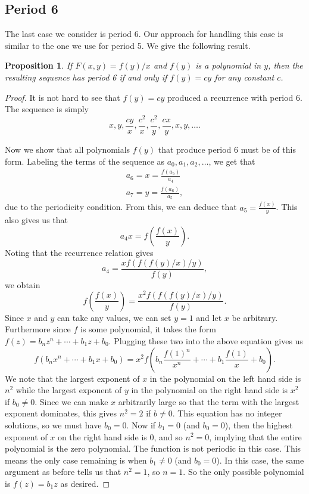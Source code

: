 \documentclass[12pt]{article}
\newtheorem{proposition}{Proposition}
\begin{document}
\subsection{Period 6}

The last case we consider is period 6. Our approach for handling this case is similar to the one we use for period 5. We give the following result.

\begin{proposition}
If $F(x,y) = f(y)/x$ and $f(y)$ is a polynomial in $y$, then the resulting sequence has period 6 if and only if $f(y) = cy$ for any constant $c$.
\end{proposition}

\begin{proof}
It is not hard to see that $f(y) = cy$ produced a recurrence with period 6. The sequence is simply
\[ x, y, \frac{cy}{x}, \frac{c^2}{x}, \frac{c^2}{y}, \frac{cx}{y}, x,y,\dots .\]

Now we show that all polynomials $f(y)$ that produce period 6 must be of this form. Labeling the terms of the sequence as $a_0, a_1, a_2, \dots$, we get that 
\begin{align*}
a_6 =x = \frac{f(a_5)}{a_4} \\ 
a_7 = y = \frac{f(a_6)}{a_5},
\end{align*}
due to the periodicity condition. From this, we can deduce that $a_5 = \frac{f(x)}{y}$. This also gives us that 
\begin{equation*}
a_4 x = f\left( \frac{f(x)}{y} \right).
\end{equation*}
Noting that the recurrence relation gives
\begin{equation*}
a_4 = \frac{ x f(f(f(y)/x)/y)}{f(y)}, 
\end{equation*}
we obtain 
\begin{equation*}
 f\left( \frac{f(x)}{y} \right) = \frac{ x^2 f(f(f(y)/x)/y)}{f(y)}.
\end{equation*}
Since $x$ and $y$ can take any values, we can set $y=1$ and let $x$ be arbitrary. Furthermore since $f$ is some polynomial, it takes the form $f(z) = b_n z^n + \cdots + b_1 z +b_0$. Plugging these two into the above equation gives us 
\begin{equation*}
f(b_n x^n + \cdots + b_1 x + b_0) = x^2 f\left( b_n \frac{f(1)^n}{x^n} + \cdots + b_1 \frac{f(1)}{x} + b_0 \right).
\end{equation*}
We note that the largest exponent of $x$ in the polynomial on the left hand side is $n^2$ while the largest exponent of $y$ in the polynomial on the right hand side is $x^2$ if $b_0 \neq 0$. Since we can make $x$ arbitrarily large so that the term with the largest exponent dominates, this gives $n^2 = 2$ if $b \neq 0$. This equation has no integer solutions, so we must have $b_0 =0$. Now if $b_1 = 0$ (and $b_0 = 0$), then the highest exponent of $x$ on the right hand side is 0, and so $n^2 = 0$, implying that the entire polynomial is the zero polynomial. The function is not periodic in this case. This means the only case remaining is when  $b_1 \neq 0$ (and $b_0 = 0$). In this case, the same argument as before tells us that $n^2 = 1$, so $n = 1$. So the only possible polynomial is $f(z) = b_1 z$ as desired. 
\end{proof}
\end{document}
